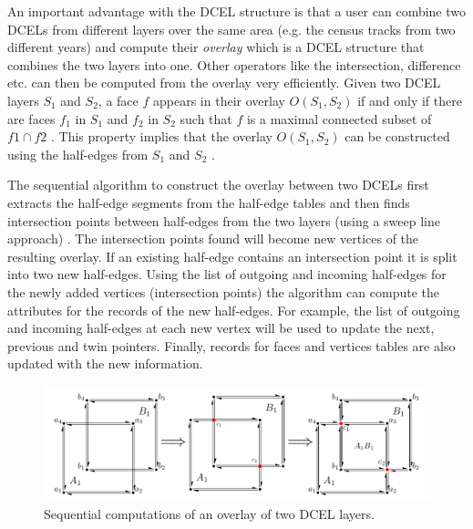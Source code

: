 An important advantage with the DCEL structure is that a user can combine two DCELs from different layers over the same area (e.g. the census tracks from two different years) and compute their \textit{overlay} which is a DCEL structure that combines the two layers into one. Other operators like the intersection, difference etc. can then be computed from the overlay very efficiently.
Given two DCEL layers $S_1$ and $S_2$, a face $f$ appears in their overlay  $O(S_1, S_2)$ if and only if there are faces $f_1$ in $S_1$ and $f_2$ in $S_2$ such that $f$ is a maximal connected subset of $f1 \cap f2$ \cite{berg_computational_2008}.  
This property implies that the overlay $O(S_1, S_2)$ can be constructed using the half-edges from $S_1$ and $S_2$ . 

The sequential algorithm \cite{fogel_cgal_2012} to construct the overlay between two DCELs first extracts the half-edge segments from the half-edge tables and then finds intersection points between half-edges from the two layers (using a sweep line approach) \cite{berg_computational_2008}. 
The intersection points found will become new vertices of the resulting overlay. 
If an existing half-edge contains an intersection point it is split into two new half-edges. 
Using the list of outgoing and incoming half-edges for the newly added vertices (intersection points) the algorithm can compute the attributes for the records of the new half-edges. For example, the list of outgoing and incoming half-edges at each new vertex will be used to update the next, previous and twin pointers. Finally, records for faces and vertices tables are also updated with the new information. 

\begin{figure}
    \centering
    \includegraphics[width=\linewidth]{figures/dcel_seq/dcel2}
    \caption{Sequential computations of an overlay of two DCEL layers.}\label{fig:dcel_seq}
\end{figure}

